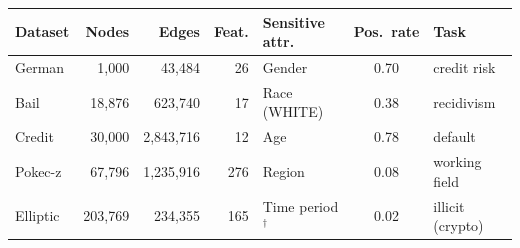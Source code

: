 \begin{tabular}{lrrrlcl}
\toprule
Dataset & Nodes & Edges & Feat. & Sensitive attr. & Pos.\ rate & Task \\
\midrule
German & 1{,}000 & 43{,}484 & 26 & Gender & 0.70 & credit risk \\
Bail & 18{,}876 & 623{,}740 & 17 & Race (WHITE) & 0.38 & recidivism \\
Credit & 30{,}000 & 2{,}843{,}716 & 12 & Age & 0.78 & default \\
Pokec-z & 67{,}796 & 1{,}235{,}916 & 276 & Region & 0.08 & working field \\
Elliptic & 203{,}769 & 234{,}355 & 165 & Time period$^\dagger$ & 0.02 & illicit (crypto) \\
\bottomrule
\end{tabular}